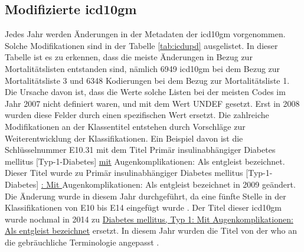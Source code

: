 \subsection{Modifizierte \acs{icd10gm}} \label{updicd}

Jedes Jahr werden Änderungen in der Metadaten der \ac{icd10gm} vorgenommen. Solche Modifikationen sind in der Tabelle \ref{tab:icdupd} ausgelistet. In dieser Tabelle ist es zu erkennen, dass die meiste Änderungen in Bezug zur Mortalitätslisten entstanden sind, nämlich \textsf{6949} \ac{icd10gm} bei dem Bezug zur Mortalitätsliste 3 und \textsf{6348} Kodierungen bei dem Bezug zur Mortalitätsliste 1. Die Ursache davon ist, dass die Werte solche Listen bei der meisten Codes im Jahr 2007 nicht definiert waren, und mit dem Wert \textsf{UNDEF} gesetzt. Erst in 2008 wurden diese Felder durch einen spezifischen Wert ersetzt. Die zahlreiche Modifikationen an der Klassentitel entstehen durch Vorschläge zur Weiterentwicklung der Klassifikationen. Ein Beispiel davon ist die Schlüsselnummer \textsf{E10.31} mit dem Titel \textsf{Primär insulinabhängiger Diabetes mellitus [Typ-1-Diabetes] \underline{mit} Augenkomplikationen: Als entgleist bezeichnet}. Dieser Titel wurde zu \textsf{Primär insulinabhängiger Diabetes mellitus [Typ-1-Diabetes] \underline{: Mit } Augenkomplikationen: Als entgleist bezeichnet} in 2009 geändert. Die Änderung wurde in diesem Jahr durchgeführt, da eine fünfte Stelle in der Klassifikationen von \textsf{E10}  bis \textsf{E14} eingefügt wurde \cite{diab09}. Der Titel dieser \ac{icd10gm} wurde nochmal in 2014 zu \textsf{\underline{Diabetes mellitus, Typ 1: Mit Augenkomplikationen: Als entgleist bezeichnet}} ersetzt. In diesem Jahr wurden die Titel von der \ac{who} an die gebräuchliche Terminologie angepasst \cite{diab14}.
\clearpage

